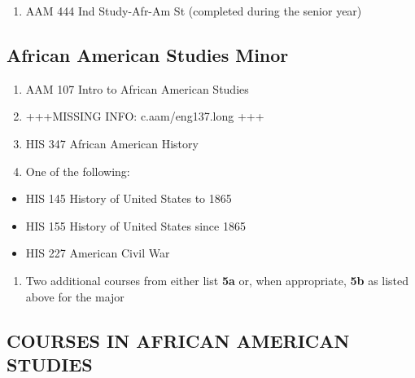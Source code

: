 \documentclass[
  letterpaper,
]{scrbook}
\providecommand{\tightlist}{%
  \setlength{\itemsep}{0pt}\setlength{\parskip}{0pt}}
\begin{document}
\begin{enumerate}
\def\labelenumi{\arabic{enumi}.}
\setcounter{enumi}{5}
\tightlist
\item
  AAM 444 Ind Study-Afr-Am St (completed during the senior year)
\end{enumerate}

\subsection{African American Studies
Minor}\label{african-american-studies-minor}

\begin{enumerate}
\def\labelenumi{\arabic{enumi}.}
\tightlist
\item
  AAM 107 Intro to African American Studies\\
\item
  +++MISSING INFO: c.aam/eng137.long +++
\item
  HIS 347 African American History\\
\item
  One of the following:
\end{enumerate}

\begin{itemize}
\tightlist
\item
  HIS 145 History of United States to 1865
\item
  HIS 155 History of United States since 1865
\item
  HIS 227 American Civil War
\end{itemize}

\begin{enumerate}
\def\labelenumi{\arabic{enumi}.}
\setcounter{enumi}{4}
\tightlist
\item
  Two additional courses from either list \textbf{5a} or, when
  appropriate, \textbf{5b} as listed above for the major
\end{enumerate}

\subsection{COURSES IN AFRICAN AMERICAN
STUDIES}\label{courses-in-african-american-studies}
\end{document}
